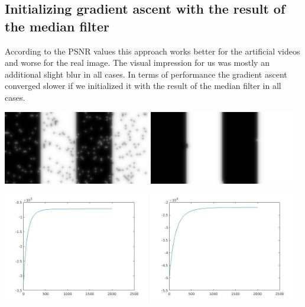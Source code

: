 \documentclass[a4paper,11pt, final]{scrartcl}
\begin{document}
\subsection*{Initializing gradient ascent with the result of the median filter}
According to the PSNR values this approach works better for the artificial videos and worse for the real image. The visual impression for us was mostly an additional slight blur in all cases. In terms of performance the gradient ascent converged slower if we initialized it with the result of the median filter in all cases.

\vspace{1cm}
{
\centering 
\includegraphics[width=0.48\textwidth]{ex3_stripes_mrf_gaussian_filter.png}
\hfill
\includegraphics[width=0.48\textwidth]{ex3_stripes_median_into_mrf_gaussian_filter.png}
}

{
\centering 
\includegraphics[width=0.48\textwidth]{ex3_stripes_gauss_mrf_posterior.jpg}
\includegraphics[width=0.48\textwidth]{ex3_stripes_median_into_gauss_mrf_posterior.jpg}
}
\end{document}
